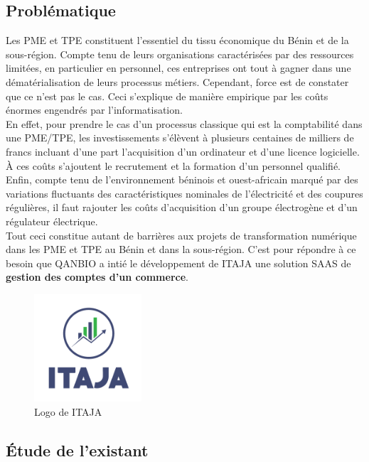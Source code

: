 \documentclass[12pt]{report}
\begin{document}
      \subsection{Problématique}
	Les \gls{PME} et \gls{TPE} constituent l’essentiel du tissu économique du Bénin et de la sous-région. Compte tenu de leurs organisations caractérisées par des ressources limitées, en particulier en personnel, ces entreprises ont tout à gagner dans une dématérialisation de leurs processus métiers. Cependant, force est de constater que ce n’est pas le cas. Ceci s’explique de manière empirique par les coûts énormes engendrés par l’informatisation.
	\\En effet, pour prendre le cas d’un processus classique qui est la comptabilité dans une PME/TPE, les investissements s’élèvent à plusieurs centaines de milliers de francs incluant d’une part l’acquisition d’un ordinateur et d’une licence logicielle. À ces coûts s’ajoutent le recrutement et la formation d’un personnel qualifié. Enfin, compte tenu de l’environnement béninois et ouest-africain marqué par des variations fluctuants des caractéristiques nominales de l'électricité et des coupures régulières, il faut rajouter les coûts d’acquisition d’un groupe électrogène et d’un régulateur électrique.
	\\Tout ceci constitue autant de barrières aux projets de transformation numérique dans les  PME et TPE au Bénin et dans la sous-région. C’est pour répondre à ce besoin que QANBIO a intié le développement de ITAJA une solution \gls{SAAS} de \textbf{gestion des comptes d’un commerce}.
	
	\begin{figure}[H]
	  \begin{center}
	    \includegraphics[scale=0.6, width=4cm]{images/logoITAJA.png}
	    \caption{Logo de ITAJA}
	  \end{center}
	\end{figure}
    
      \subsection{Étude de l'existant}
\end{document}
